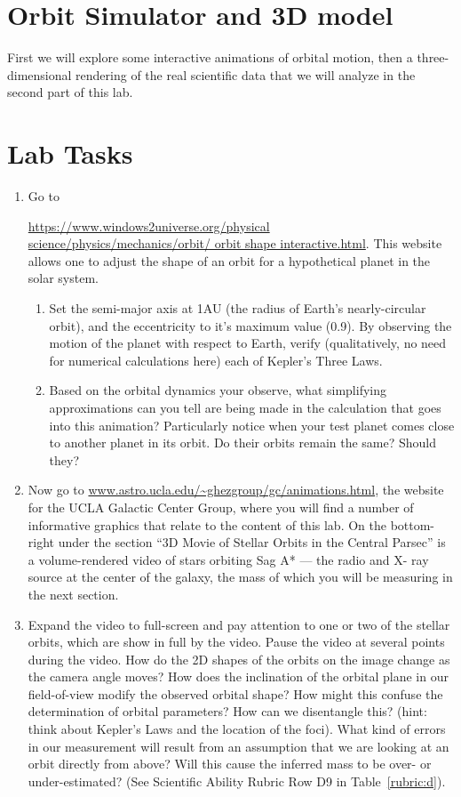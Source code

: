 \section{Orbit Simulator and 3D model}

First we will explore some interactive animations of orbital motion, then a three-dimensional rendering
of the real scientific data that we will analyze in the second part of this lab.

\section{Lab Tasks}
\begin{enumerate}
	\item Go to
	
	\url{https://www.windows2universe.org/physical science/physics/mechanics/orbit/
	orbit shape interactive.html}. This website allows one to adjust the shape of an orbit for a hypothetical planet in the solar system.

	\begin{enumerate}
		\item Set the semi-major axis at 1AU (the radius of Earth’s nearly-circular orbit), and the eccentricity to it’s maximum value (0.9). By observing the motion of the planet with respect to
		Earth, verify (qualitatively, no need for numerical calculations here) each of Kepler’s Three
		Laws.
		
		\item Based on the orbital dynamics your observe, what simplifying approximations can you tell
		are being made in the calculation that goes into this animation? Particularly notice when
		your test planet comes close to another planet in its orbit. Do their orbits remain the same?
		Should they?
	\end{enumerate}

	\item Now go to \url{www.astro.ucla.edu/~ghezgroup/gc/animations.html}, the website for the UCLA
	Galactic Center Group, where you will find a number of informative graphics that relate to the
	content of this lab. On the bottom-right under the section “3D Movie of Stellar Orbits in the Central Parsec” is a volume-rendered video of stars orbiting Sag A* --- the radio and X-
	ray source at the center of the galaxy, the mass of which you will be measuring in the next
	section.
	
	\item Expand the video to full-screen and pay attention to one or two of the stellar orbits,
	which are show in full by the video. Pause the video at several points during the video. How
	do the 2D shapes of the orbits on the image change as the camera angle moves? How does the
	inclination of the orbital plane in our field-of-view modify the observed orbital shape? How might
	this confuse the determination of orbital parameters? How can we disentangle this? (hint: think
	about Kepler’s Laws and the location of the foci). What kind of errors in our measurement will
	result from an assumption that we are looking at an orbit directly from above? Will this cause the inferred mass to be over- or under-estimated? (See Scientific Ability Rubric Row D9 in Table~\ref{rubric:d}).
	

\end{enumerate}
